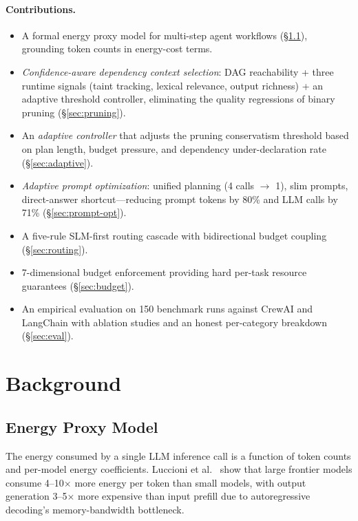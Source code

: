 \documentclass[sigconf,authordraft]{acmart}
\begin{document}
\paragraph{Contributions.}
\begin{itemize}[leftmargin=2em,itemsep=2pt]
  \item A formal energy proxy model for multi-step agent workflows (\S\ref{sec:energy}), grounding token counts in energy-cost terms.
  \item \emph{Confidence-aware dependency context selection}: DAG reachability + three runtime signals (taint tracking, lexical relevance, output richness) + an adaptive threshold controller, eliminating the quality regressions of binary pruning (\S\ref{sec:pruning}).
  \item An \emph{adaptive controller} that adjusts the pruning conservatism threshold based on plan length, budget pressure, and dependency under-declaration rate (\S\ref{sec:adaptive}).
  \item \emph{Adaptive prompt optimization}: unified planning (4 calls $\to$ 1), slim prompts, direct-answer shortcut---reducing prompt tokens by 80\% and LLM calls by 71\% (\S\ref{sec:prompt-opt}).
  \item A five-rule SLM-first routing cascade with bidirectional budget coupling (\S\ref{sec:routing}).
  \item 7-dimensional budget enforcement providing hard per-task resource guarantees (\S\ref{sec:budget}).
  \item An empirical evaluation on 150 benchmark runs against CrewAI and LangChain with ablation studies and an honest per-category breakdown (\S\ref{sec:eval}).
\end{itemize}

\section{Background}
\label{sec:background}

\subsection{Energy Proxy Model}
\label{sec:energy}

The energy consumed by a single LLM inference call is a function of token counts and per-model energy coefficients.
Luccioni et al.~\cite{luccioni2023power} show that large frontier models consume 4--10$\times$ more energy per token than small models, with output generation 3--5$\times$ more expensive than input prefill due to autoregressive decoding's memory-bandwidth bottleneck.
\end{document}
